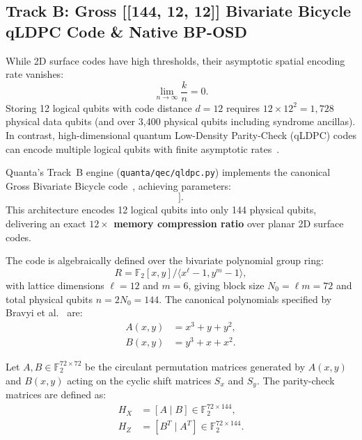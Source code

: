 \documentclass[aps,prx,twocolumn,superscriptaddress,nofootinbib]{revtex4-2}
\begin{document}
\subsection{Track B: Gross [[144, 12, 12]] Bivariate Bicycle qLDPC Code \& Native BP-OSD}
\label{subsec:track_b_qldpc}

While 2D surface codes have high thresholds, their asymptotic spatial encoding rate vanishes:
\begin{equation}
    \lim_{n \to \infty} \frac{k}{n} = 0.
\end{equation}
Storing 12 logical qubits with code distance $d=12$ requires $12 \times 12^2 = 1,728$ physical data qubits (and over 3,400 physical qubits including syndrome ancillas). In contrast, high-dimensional quantum Low-Density Parity-Check (qLDPC) codes can encode multiple logical qubits with finite asymptotic rates~\cite{panteleev2021degenerate,panteleev2022asymptotically}.

Quanta's Track~B engine (\texttt{quanta/qec/qldpc.py}) implements the canonical Gross Bivariate Bicycle code~\cite{bravyi2024high,kovalev2013quantum}, achieving parameters:
\begin{equation}
    [[n=144, k=12, d=12]].
\end{equation}
This architecture encodes 12 logical qubits into only 144 physical qubits, delivering an exact \textbf{$12\times$ memory compression ratio} over planar 2D surface codes.

The code is algebraically defined over the bivariate polynomial group ring:
\begin{equation}
    R = \mathbb{F}_2[x, y] / \langle x^\ell - 1, y^m - 1 \rangle,
\end{equation}
with lattice dimensions $\ell = 12$ and $m = 6$, giving block size $N_0 = \ell m = 72$ and total physical qubits $n = 2 N_0 = 144$. The canonical polynomials specified by Bravyi et al.~\cite{bravyi2024high} are:
\begin{align}
    A(x, y) &= x^3 + y + y^2, \\
    B(x, y) &= y^3 + x + x^2.
\end{align}

Let $A, B \in \mathbb{F}_2^{72 \times 72}$ be the circulant permutation matrices generated by $A(x, y)$ and $B(x, y)$ acting on the cyclic shift matrices $S_x$ and $S_y$. The parity-check matrices are defined as:
\begin{align}
    H_X &= [A \mid B] \in \mathbb{F}_2^{72 \times 144}, \\
    H_Z &= [B^T \mid A^T] \in \mathbb{F}_2^{72 \times 144}.
\end{align}
\end{document}

